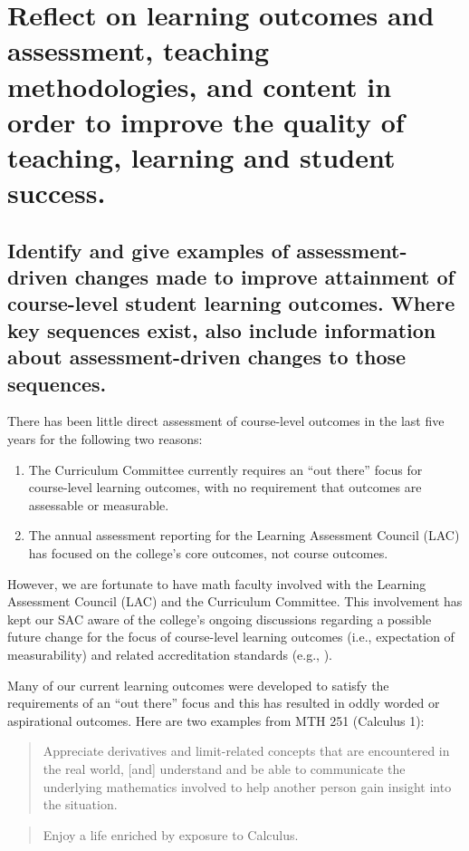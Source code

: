 \chapter[Outcomes and Assessment]{Reflect on learning outcomes and assessment, teaching methodologies, and content in order to improve the quality of teaching, learning and student success.}

\section[Course-Level Outcomes]{Identify and give examples of assessment-driven changes made to improve attainment of course-level student learning outcomes.   Where key sequences exist, also include information about assessment-driven changes to those sequences.}

There has been little direct assessment of course-level outcomes in the last five years for the following two reasons: 
\begin{enumerate}
\item The Curriculum Committee currently requires an ``out there'' focus for course-level learning outcomes, with no requirement that outcomes are assessable or measurable.
\item The annual assessment reporting for the Learning Assessment Council (LAC) has focused on the college's core outcomes, not course outcomes.  
\end{enumerate}


However, we are fortunate to have math faculty involved with the Learning Assessment Council (LAC) and the Curriculum Committee. This involvement has kept our SAC aware of the college's ongoing discussions regarding a possible future change for the focus of course-level learning outcomes  (i.e., expectation of measurability) and related accreditation standards (e.g., \cite[Standard 4.A.3]{NWCCU}).

Many of our current learning outcomes were developed to satisfy the requirements of an ``out there'' focus and this has resulted in oddly worded or aspirational outcomes.  Here are two examples from MTH 251 (Calculus 1):

\begin{quote}
Appreciate derivatives and limit-related concepts that are encountered in the real world, [and] understand and be able to communicate the underlying mathematics involved to help another person gain insight into the situation.
\end{quote}
\begin{quote}
Enjoy a life enriched by exposure to Calculus.
\end{quote}

